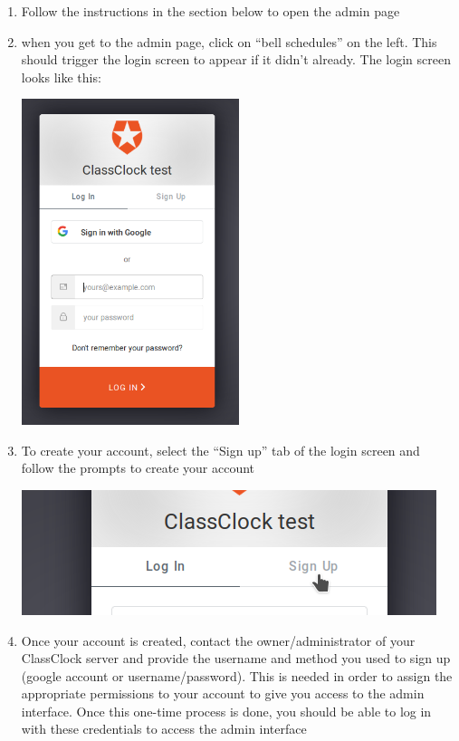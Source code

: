 \documentclass{article}
\begin{document}
\begin{enumerate}
\item {Follow the instructions in the section below to open the admin page}
\item {when you get to the admin page, click on “bell schedules” on the left. This should trigger the login screen to appear if
it didn't already. The login screen looks like this:
}
\begin{center}
\includegraphics[width=0.5\textwidth]{Mini20Manual-img005.png}
\end{center}
\item {To create your account, select the “Sign up” tab of the login screen and follow the prompts to create your account}
\begin{center}
\includegraphics[width=4.7701in,height=1.4366in]{Mini20Manual-img006.png}
\end{center}

\item {Once your account is created, contact the owner/administrator of your ClassClock server and provide the username and
method you used to sign up (google account or username/password). This is needed in order to assign the appropriate
permissions to your account to give you access to the admin interface. Once this one-time process is done, you should
be able to log in with these credentials to access the admin interface}
\end{enumerate}
\end{document}
